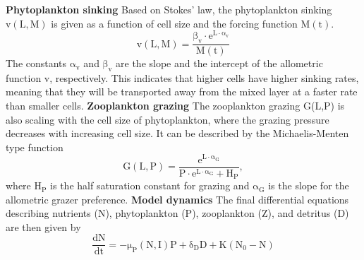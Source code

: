 \newline
\newline
\textbf{Phytoplankton sinking}
\newline
Based on Stokes' law, the phytoplankton sinking $\mathrm{v(L,M)}$ is given as a function of cell size and the forcing function $\mathrm{M(t)}$.
\begin{equation}
    \label{eq:sinking}
    \mathrm{v(L,M) = \frac{\beta_v\cdot e^{L\cdot \alpha_v}}{M(t)}}
\end{equation}
The constants $\mathrm{\alpha_v}$ and $\mathrm{\beta_v}$ are the slope and the intercept of the allometric function v, respectively. This indicates that higher cells have higher sinking rates, meaning that they will be transported away from the mixed layer at a faster rate than smaller cells. 
\newline
\newline
\textbf{Zooplankton grazing}
\newline
The zooplankton grazing G(L,P) is also scaling with the cell size of phytoplankton, where the grazing pressure decreases with increasing cell size. It can be described by the Michaelis-Menten type function
\begin{equation}
    \label{eq:grazing}
    \mathrm{G(L,P) = \frac{e^{L\cdot\alpha_G}}{P\cdot e^{L\cdot \alpha_G}+H_P}},
\end{equation}
where $\mathrm{H_P}$ is the half saturation constant for grazing and $\mathrm{\alpha_G}$ is the slope for the allometric grazer preference.
\newline
\newline
\textbf{Model dynamics}
\newline
The final differential equations describing nutrients (N), phytoplankton (P), zooplankton (Z), and detritus (D) are then given by
\begin{equation}
    \label{eq:Ndynamics}
    \mathrm{\frac{dN}{dt} = -\mu_P(N,I)P+\delta_D D+K(N_0-N)}
\end{equation}
